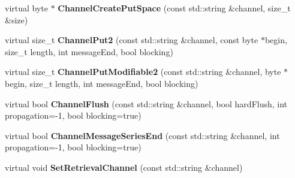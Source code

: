 \begin{DoxyCompactItemize}
\item 
\hypertarget{class_buffered_transformation_a834053258b6a6e0e5c0a597dc259f42d}{
virtual byte $\ast$ {\bfseries ChannelCreatePutSpace} (const std::string \&channel, size\_\-t \&size)}
\label{class_buffered_transformation_a834053258b6a6e0e5c0a597dc259f42d}

\item 
\hypertarget{class_buffered_transformation_ab20557ace6bfda8acba9ee57d9d00d7d}{
virtual size\_\-t {\bfseries ChannelPut2} (const std::string \&channel, const byte $\ast$begin, size\_\-t length, int messageEnd, bool blocking)}
\label{class_buffered_transformation_ab20557ace6bfda8acba9ee57d9d00d7d}

\item 
\hypertarget{class_buffered_transformation_af0723e5ae7953408d03620a6503ea99c}{
virtual size\_\-t {\bfseries ChannelPutModifiable2} (const std::string \&channel, byte $\ast$begin, size\_\-t length, int messageEnd, bool blocking)}
\label{class_buffered_transformation_af0723e5ae7953408d03620a6503ea99c}

\item 
\hypertarget{class_buffered_transformation_a29e324c1d04716307b5dd0a6ead58f0f}{
virtual bool {\bfseries ChannelFlush} (const std::string \&channel, bool hardFlush, int propagation=-\/1, bool blocking=true)}
\label{class_buffered_transformation_a29e324c1d04716307b5dd0a6ead58f0f}

\item 
\hypertarget{class_buffered_transformation_acab2b9aa582c7e7974d15beb05df22af}{
virtual bool {\bfseries ChannelMessageSeriesEnd} (const std::string \&channel, int propagation=-\/1, bool blocking=true)}
\label{class_buffered_transformation_acab2b9aa582c7e7974d15beb05df22af}

\item 
\hypertarget{class_buffered_transformation_a28c0fc64ae71ed6e9915682b67c663f9}{
virtual void {\bfseries SetRetrievalChannel} (const std::string \&channel)}
\label{class_buffered_transformation_a28c0fc64ae71ed6e9915682b67c663f9}

\end{DoxyCompactItemize}

